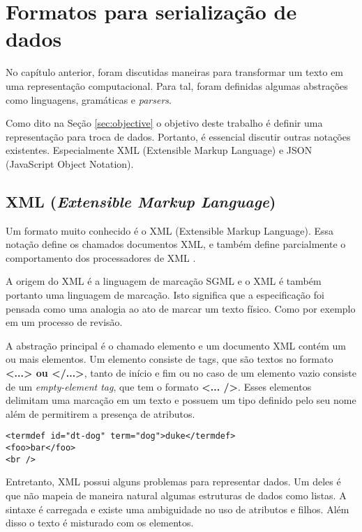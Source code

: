 \chapter{Formatos para serialização de dados}

No capítulo anterior, foram discutidas maneiras para transformar um texto 
em uma representação computacional. Para tal, foram definidas algumas abstrações
como linguagens, gramáticas e \textit{parsers}.

Como dito na Seção \ref{sec:objective} o objetivo deste trabalho é definir
uma representação para troca de dados. Portanto, é essencial discutir outras
notações existentes. Especialmente XML (Extensible Markup Language) e 
JSON (JavaScript Object Notation).

\section{XML (\textit{Extensible Markup Language})}

Um formato muito conhecido é o XML (Extensible Markup Language). 
Essa notação define os chamados documentos XML, e também define parcialmente o comportamento 
dos processadores de XML \cite{XML}. 

A origem do XML é a linguagem de marcação SGML e o XML é também portanto uma linguagem de marcação.
Isto significa que a especificação foi pensada como uma analogia ao ato de marcar um texto físico.
Como por exemplo em um processo de revisão.

A abstração principal é o chamado elemento e um documento XML contém um ou mais elementos. 
Um elemento consiste de tags, que são textos no formato \textbf{<...> ou </...>}, tanto de
início e fim ou no caso de um elemento vazio consiste de um \textit{empty-element tag}, que 
tem o formato \textbf{<... />}. Esses elementos delimitam uma marcação em um texto e 
possuem um tipo definido pelo seu nome além de permitirem a presença de atributos. 

\begin{lstlisting}[caption=Exemplo de elementos XML,label={lst:xmlelement}]
<termdef id="dt-dog" term="dog">duke</termdef>
<foo>bar</foo>
<br />
\end{lstlisting}

Entretanto, XML possui alguns problemas para representar dados. Um deles é
que não mapeia de maneira natural algumas estruturas de dados como listas. A sintaxe é
carregada e existe uma ambiguidade no uso de atributos e filhos. Além disso o texto 
é misturado com os elementos.

